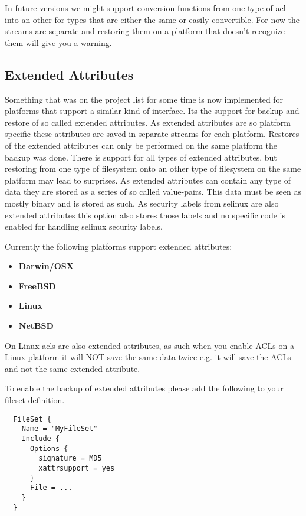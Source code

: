 In future versions we might support conversion functions from one type of acl
into an other for types that are either the same or easily convertible. For now
the streams are separate and restoring them on a platform that doesn't
recognize them will give you a warning.

\subsection{Extended Attributes}
Something that was on the project list for some time is now implemented for
platforms that support a similar kind of interface. Its the support for backup
and restore of so called extended attributes. As extended attributes are so
platform specific these attributes are saved in separate streams for each
platform.  Restores of the extended attributes can only be performed on the
same platform the backup was done.  There is support for all types of extended
attributes, but restoring from one type of filesystem onto an other type of
filesystem on the same platform may lead to surprises.  As extended attributes
can contain any type of data they are stored as a series of so called
value-pairs.  This data must be seen as mostly binary and is stored as such.
As security labels from selinux are also extended attributes this option also
stores those labels and no specific code is enabled for handling selinux
security labels.

Currently the following platforms support extended attributes:
\begin{itemize}
 \item {\bf Darwin/OSX}
 \item {\bf FreeBSD}
 \item {\bf Linux}
 \item {\bf NetBSD}
\end{itemize}

On Linux acls are also extended attributes, as such when you enable ACLs on a
Linux platform it will NOT save the same data twice e.g. it will save the ACLs
and not the same extended attribute.

To enable the backup of extended attributes please add the following to your
fileset definition.
\begin{verbatim}
  FileSet {
    Name = "MyFileSet"
    Include {
      Options {
        signature = MD5
        xattrsupport = yes
      }
      File = ...
    }
  }
\end{verbatim}

